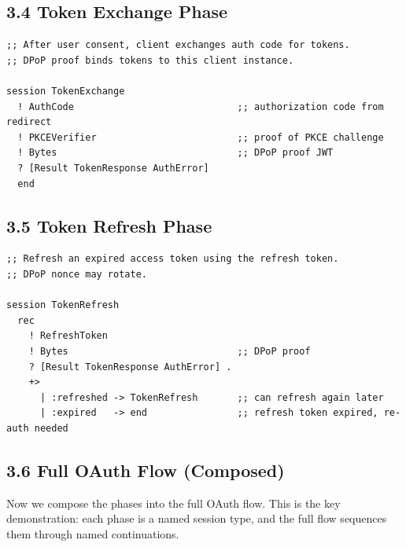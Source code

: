 \documentclass[11pt]{article}
\begin{document}
\subsection{3.4 Token Exchange Phase}
\label{sec:org48e245c}

\begin{verbatim}
;; After user consent, client exchanges auth code for tokens.
;; DPoP proof binds tokens to this client instance.

session TokenExchange
  ! AuthCode                             ;; authorization code from redirect
  ! PKCEVerifier                         ;; proof of PKCE challenge
  ! Bytes                                ;; DPoP proof JWT
  ? [Result TokenResponse AuthError]
  end
\end{verbatim}
\subsection{3.5 Token Refresh Phase}
\label{sec:org9b4a595}

\begin{verbatim}
;; Refresh an expired access token using the refresh token.
;; DPoP nonce may rotate.

session TokenRefresh
  rec
    ! RefreshToken
    ! Bytes                              ;; DPoP proof
    ? [Result TokenResponse AuthError] .
    +>
      | :refreshed -> TokenRefresh       ;; can refresh again later
      | :expired   -> end                ;; refresh token expired, re-auth needed
\end{verbatim}
\subsection{3.6 Full OAuth Flow (Composed)}
\label{sec:org5dd8305}

Now we compose the phases into the full OAuth flow. This is the key
demonstration: each phase is a named session type, and the full flow
sequences them through named continuations.
\end{document}
